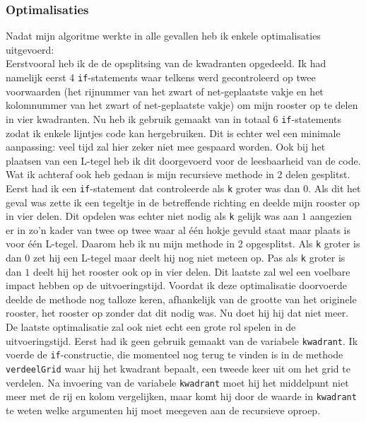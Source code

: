 \documentclass[12pt,a4paper]{report}
\begin{document}
\subsubsection*{Optimalisaties}
Nadat mijn algoritme werkte in alle gevallen heb ik enkele optimalisaties uitgevoerd: \\
Eerstvooral heb ik de de opsplitsing van de kwadranten opgedeeld. Ik had namelijk eerst 4 \texttt{if}-statements waar telkens werd gecontroleerd op twee voorwaarden (het rijnummer van het zwart of net-geplaatste vakje en het kolomnummer van het zwart of net-geplaatste vakje) om mijn rooster op te delen in vier kwadranten. Nu heb ik gebruik gemaakt van in totaal 6 \texttt{if}-statements zodat ik enkele lijntjes code kan hergebruiken. Dit is echter wel een minimale aanpassing: veel tijd zal hier zeker niet mee gespaard worden. Ook bij het plaatsen van een L-tegel heb ik dit doorgevoerd voor de leesbaarheid van de code.
\\
Wat ik achteraf ook heb gedaan is mijn recursieve methode in 2 delen gesplitst. Eerst had ik een \texttt{if}-statement dat controleerde als \texttt{k} groter was dan $0$. Als dit het geval was zette ik een tegeltje in de betreffende richting en deelde mijn rooster op in vier delen. Dit opdelen was echter niet nodig als \texttt{k} gelijk was aan $1$ aangezien er in zo'n kader van twee op twee waar al \'e\'en hokje gevuld staat maar plaats is voor \'e\'en L-tegel. Daarom heb ik nu mijn methode in 2 opgesplitst. Als \texttt{k} groter is dan $0$ zet hij een L-tegel maar deelt hij nog niet meteen op. Pas als \texttt{k} groter is dan $1$ deelt hij het rooster ook op in vier delen. Dit laatste zal wel een voelbare impact hebben op de uitvoeringstijd. Voordat ik deze optimalisatie doorvoerde deelde de methode nog talloze keren, afhankelijk van de grootte van het originele rooster, het rooster op zonder dat dit nodig was. Nu doet hij hij dat niet meer.
\\
De laatste optimalisatie zal ook niet echt een grote rol spelen in de uitvoeringstijd. Eerst had ik geen gebruik gemaakt van de variabele \texttt{kwadrant}. Ik voerde de \texttt{if}-constructie, die momenteel nog terug te vinden is in de methode \texttt{verdeelGrid} waar hij het kwadrant bepaalt, een tweede keer uit om het grid te verdelen. Na invoering van de variabele \texttt{kwadrant} moet hij het middelpunt niet meer met de rij en kolom vergelijken, maar komt hij door de waarde in \texttt{kwadrant} te weten welke argumenten hij moet meegeven aan de recursieve oproep.
\end{document}
